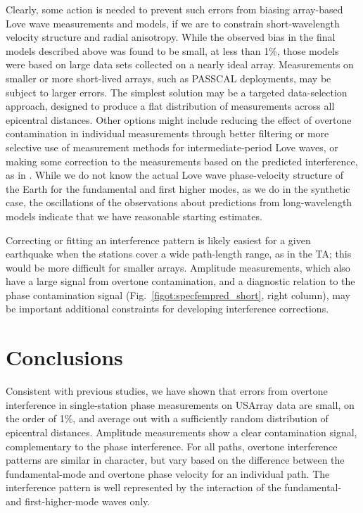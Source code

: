 \documentclass[12pt,oneside]{book}
\begin{document}
Clearly, some action is needed to prevent such errors from biasing array-based Love wave measurements and models, if we are to constrain short-wavelength velocity structure and radial anisotropy. While the observed bias in the final models described above \citep{Fosteretal2014} was found to be small, at less than 1\%, those models were based on large data sets collected on a nearly ideal array. Measurements on smaller or more short-lived arrays, such as PASSCAL deployments, may be subject to larger errors. The simplest solution may be a targeted data-selection approach, designed to produce a flat distribution of measurements across all epicentral distances. Other options might include reducing the effect of overtone contamination in individual measurements through better filtering or more selective use of measurement methods for intermediate-period Love waves, or making some correction to the measurements based on the predicted interference, as in \citet{Forsyth1975}. While we do not know the actual Love wave phase-velocity structure of the Earth for the fundamental and first higher modes, as we do in the synthetic case, the oscillations of the observations about predictions from long-wavelength models indicate that we have reasonable starting estimates. 

Correcting or fitting an interference pattern is likely easiest for a given earthquake when the stations cover a wide path-length range, as in the TA; this would be more difficult for smaller arrays. Amplitude measurements, which also have a large signal from overtone contamination, and a diagnostic relation to the phase contamination signal (Fig.~\ref{figot:specfempred_short}, right column), may be important additional constraints for developing interference corrections. 

\section{Conclusions}
Consistent with previous studies, we have shown that errors from overtone interference in single-station phase measurements on USArray data are small, on the order of 1\%, and average out with a sufficiently random distribution of epicentral distances. Amplitude measurements show a clear contamination signal, complementary to the phase interference. For all paths, overtone interference patterns are similar in character, but vary based on the difference between the fundamental-mode and overtone phase velocity for an individual path. The interference pattern is well represented by the interaction of the fundamental- and first-higher-mode waves only.
\end{document}
